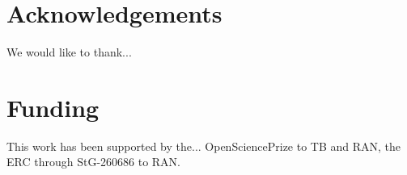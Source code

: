 \documentclass{bioinfo}
\begin{document}
\vspace*{-10pt}

\section*{Acknowledgements}
We would like to thank...

\vspace*{-12pt}

\section*{Funding}

This work has been supported by the...
OpenSciencePrize to TB and RAN, the ERC through StG-260686 to RAN.

\vspace*{-12pt}



\end{document}

